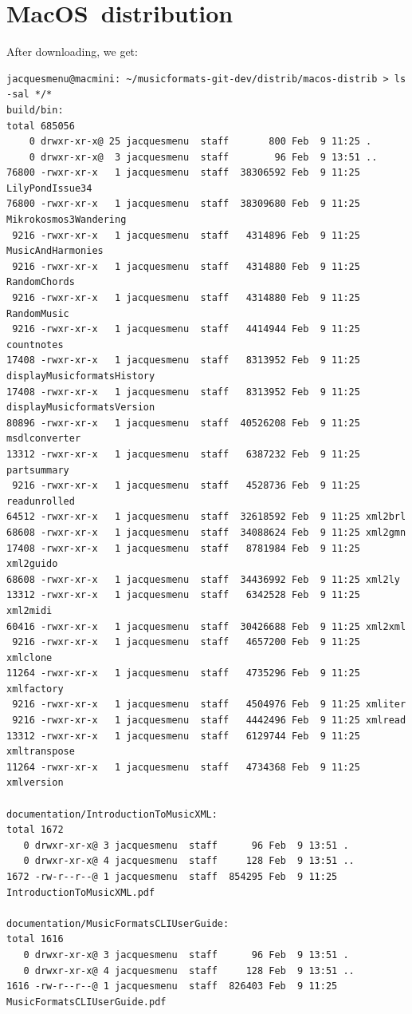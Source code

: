 \section{MacOS\texttrademark\ distribution}


After downloading, we get:
\begin{lstlisting}[language=Terminal]
jacquesmenu@macmini: ~/musicformats-git-dev/distrib/macos-distrib > ls -sal */*
build/bin:
total 685056
    0 drwxr-xr-x@ 25 jacquesmenu  staff       800 Feb  9 11:25 .
    0 drwxr-xr-x@  3 jacquesmenu  staff        96 Feb  9 13:51 ..
76800 -rwxr-xr-x   1 jacquesmenu  staff  38306592 Feb  9 11:25 LilyPondIssue34
76800 -rwxr-xr-x   1 jacquesmenu  staff  38309680 Feb  9 11:25 Mikrokosmos3Wandering
 9216 -rwxr-xr-x   1 jacquesmenu  staff   4314896 Feb  9 11:25 MusicAndHarmonies
 9216 -rwxr-xr-x   1 jacquesmenu  staff   4314880 Feb  9 11:25 RandomChords
 9216 -rwxr-xr-x   1 jacquesmenu  staff   4314880 Feb  9 11:25 RandomMusic
 9216 -rwxr-xr-x   1 jacquesmenu  staff   4414944 Feb  9 11:25 countnotes
17408 -rwxr-xr-x   1 jacquesmenu  staff   8313952 Feb  9 11:25 displayMusicformatsHistory
17408 -rwxr-xr-x   1 jacquesmenu  staff   8313952 Feb  9 11:25 displayMusicformatsVersion
80896 -rwxr-xr-x   1 jacquesmenu  staff  40526208 Feb  9 11:25 msdlconverter
13312 -rwxr-xr-x   1 jacquesmenu  staff   6387232 Feb  9 11:25 partsummary
 9216 -rwxr-xr-x   1 jacquesmenu  staff   4528736 Feb  9 11:25 readunrolled
64512 -rwxr-xr-x   1 jacquesmenu  staff  32618592 Feb  9 11:25 xml2brl
68608 -rwxr-xr-x   1 jacquesmenu  staff  34088624 Feb  9 11:25 xml2gmn
17408 -rwxr-xr-x   1 jacquesmenu  staff   8781984 Feb  9 11:25 xml2guido
68608 -rwxr-xr-x   1 jacquesmenu  staff  34436992 Feb  9 11:25 xml2ly
13312 -rwxr-xr-x   1 jacquesmenu  staff   6342528 Feb  9 11:25 xml2midi
60416 -rwxr-xr-x   1 jacquesmenu  staff  30426688 Feb  9 11:25 xml2xml
 9216 -rwxr-xr-x   1 jacquesmenu  staff   4657200 Feb  9 11:25 xmlclone
11264 -rwxr-xr-x   1 jacquesmenu  staff   4735296 Feb  9 11:25 xmlfactory
 9216 -rwxr-xr-x   1 jacquesmenu  staff   4504976 Feb  9 11:25 xmliter
 9216 -rwxr-xr-x   1 jacquesmenu  staff   4442496 Feb  9 11:25 xmlread
13312 -rwxr-xr-x   1 jacquesmenu  staff   6129744 Feb  9 11:25 xmltranspose
11264 -rwxr-xr-x   1 jacquesmenu  staff   4734368 Feb  9 11:25 xmlversion

documentation/IntroductionToMusicXML:
total 1672
   0 drwxr-xr-x@ 3 jacquesmenu  staff      96 Feb  9 13:51 .
   0 drwxr-xr-x@ 4 jacquesmenu  staff     128 Feb  9 13:51 ..
1672 -rw-r--r--@ 1 jacquesmenu  staff  854295 Feb  9 11:25 IntroductionToMusicXML.pdf

documentation/MusicFormatsCLIUserGuide:
total 1616
   0 drwxr-xr-x@ 3 jacquesmenu  staff      96 Feb  9 13:51 .
   0 drwxr-xr-x@ 4 jacquesmenu  staff     128 Feb  9 13:51 ..
1616 -rw-r--r--@ 1 jacquesmenu  staff  826403 Feb  9 11:25 MusicFormatsCLIUserGuide.pdf
\end{lstlisting}

